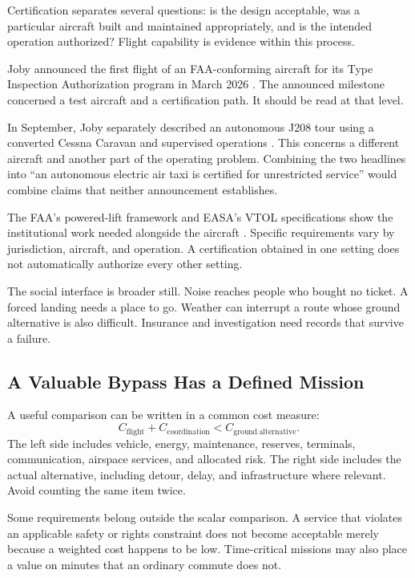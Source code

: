 Certification separates several questions: is the design acceptable, was a particular aircraft built and maintained appropriately, and is the intended operation authorized? Flight capability is evidence within this process.

Joby announced the first flight of an FAA-conforming aircraft for its Type Inspection Authorization program in March 2026 \cite{joby2026conforming}. The announced milestone concerned a test aircraft and a certification path. It should be read at that level.

In September, Joby separately described an autonomous J208 tour using a converted Cessna Caravan and supervised operations \cite{joby2026j208}. This concerns a different aircraft and another part of the operating problem. Combining the two headlines into “an autonomous electric air taxi is certified for unrestricted service” would combine claims that neither announcement establishes.

The FAA's powered-lift framework and EASA's VTOL specifications show the institutional work needed alongside the aircraft \cite{faa2026aam,easa2026vtol}. Specific requirements vary by jurisdiction, aircraft, and operation. A certification obtained in one setting does not automatically authorize every other setting.

The social interface is broader still. Noise reaches people who bought no ticket. A forced landing needs a place to go. Weather can interrupt a route whose ground alternative is also difficult. Insurance and investigation need records that survive a failure.

\subsection{A Valuable Bypass Has a Defined Mission}

A useful comparison can be written in a common cost measure:
\begin{equation}
 C_{\mathrm{flight}}+C_{\mathrm{coordination}}
 <C_{\mathrm{ground\ alternative}}.
\end{equation}
The left side includes vehicle, energy, maintenance, reserves, terminals, communication, airspace services, and allocated risk. The right side includes the actual alternative, including detour, delay, and infrastructure where relevant. Avoid counting the same item twice.

Some requirements belong outside the scalar comparison. A service that violates an applicable safety or rights constraint does not become acceptable merely because a weighted cost happens to be low. Time-critical missions may also place a value on minutes that an ordinary commute does not.

